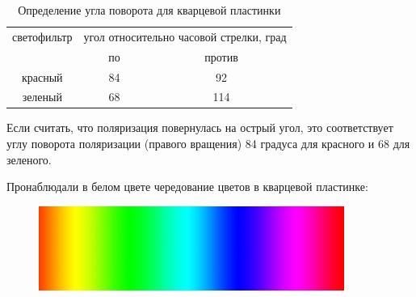 \begin{table}[H]
	\caption{Определение угла поворота для кварцевой пластинки}
	\centering
	\begin{tabular}{|c|c|c|}
		\hline
		\multicolumn{ 1}{|c|}{светофильтр} & \multicolumn{ 2}{c|}{угол относительно часовой стрелки, град} \\ \cline{ 2- 3}
		\multicolumn{ 1}{|c|}{} & \multicolumn{1}{c|}{по} & против \\ \hline
		красный & 84 & \multicolumn{1}{c|}{92} \\ \hline
		зеленый & 68 & \multicolumn{1}{c|}{114} \\ \hline
	\end{tabular}
	\label{}
\end{table}

Если считать, что поляризация повернулась на острый угол, это соответствует углу поворота поляризации (правого вращения) 84 градуса для красного и 68 для зеленого.


Пронаблюдали в белом цвете чередование цветов в кварцевой пластинке:

\begin{figure}[H]
	\centering
	\includegraphics[width=10cm]{images/RADUGA.jpg}
	\caption{}
	\label{fig:figure6}
\end{figure}

